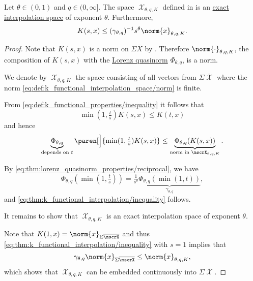 \begin{theorem}\label{thm:k_functional_interpolation}\mcite\cite[thm. 3.1.2]{Bergh1976}
  Let \( \theta \in (0, 1) \) and \( q \in (0, \infty] \). The space \( \mscrX_{\theta,q,K} \) defined in  is an \hyperref[def:banach_interpolation_space_exponent]{exact interpolation space} of exponent \( \theta \). Furthermore,
  \begin{equation}\label{eq:thm:k_functional_interpolation/inequality}
    K(s, x) \leq (\gamma_{\theta,q})^{-1} s^\theta \norm{x}_{\theta,q,K}.
  \end{equation}
\end{theorem}
\begin{proof}
  Note that \( K(s, x) \) is a norm on \( \Sigma \overline{X} \) by . Therefore \( \norm{\cdot}_{\theta,q,K} \), the composition of \( K(s, x) \) with the \hyperref[def:lorenz_quasinorm]{Lorenz quasinorm} \( \Phi_{\theta,q} \), is a norm.

  We denote by \( \mscrX_{\theta,q,K} \) the space consisting of all vectors from \( \Sigma \overline{\mscrX} \) where the norm \eqref{eq:def:k_functional_interpolation_space/norm} is finite.

  From \eqref{eq:def:k_functional_properties/inequality} it follows that
  \begin{equation*}
    \min(1, \tfrac t s) K(s, x) \leq K(t, x)
  \end{equation*}
  and hence
  \begin{equation*}
    \underbrace{\Phi_{\theta,q}}_{\text{depends on } t} \paren[\Big]{ \min(1, \tfrac t s) K(s, x) } \leq \underbrace{\Phi_{\theta,q}(K(s, x))}_{\text{norm in } \mscrX_{\theta,q,K}}.
  \end{equation*}

  By \eqref{eq:thm:lorenz_quasinorm_properties/reciprocal}, we have
  \begin{equation*}
    \Phi_{\theta,q}(\min(1, \tfrac t s)) = \tfrac 1 {s^\theta} \underbrace{\Phi_{\theta,q}(\min(1, t))}_{\hyperref[eq:def:lorenz_quasinorm/gamma]{\gamma_{\theta,q}}},
  \end{equation*}
  and \eqref{eq:thm:k_functional_interpolation/inequality} follows.

  It remains to show that \( \mscrX_{\theta,q,K} \) is an exact interpolation space of exponent \( \theta \).

  Note that \( K(1, x) = \norm{x}_{\Sigma \overline{\mscrX}} \) and thus \eqref{eq:thm:k_functional_interpolation/inequality} with \( s = 1 \) implies that
  \begin{equation*}
    \gamma_{\theta,q} \norm{x}_{\Sigma \overline{\mscrX}} \leq \norm{x}_{\theta,q,K},
  \end{equation*}
  which shows that \( \mscrX_{\theta,q,K} \) can be embedded continuously into \( \Sigma \overline{\mscrX} \).


\end{proof}
